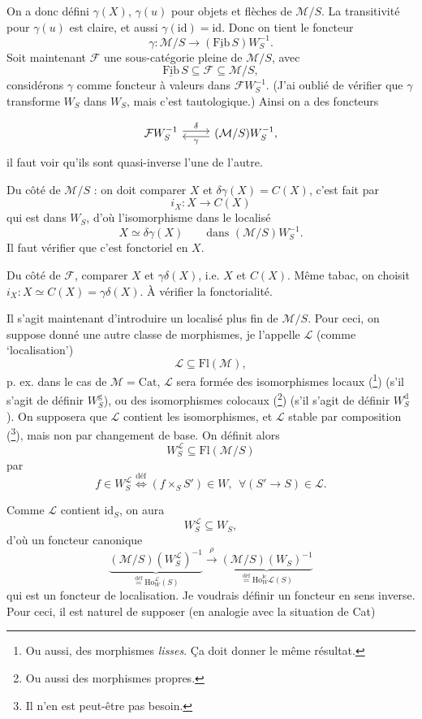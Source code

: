 \documentclass[11pt]{article}
\newcommand{\printedpage}[1]{\marginpar{\footnotesize p.~#1}}
\newcommand{\msp}[1]{\marginpar{\footnotesize [#1]}}
\newcommand{\cM}{\mathcal{M}}
\newcommand{\cF}{\mathcal{F}}
\newcommand{\Fib}{\underline{\mathrm{Fib}}\,}
\newcommand{\Ho}{\mathrm{Ho}}
\newcommand{\WL}{W_S^{\mathcal{L}}}
\newcommand{\defeq}{\overset{\text{déf}}{=}}
\begin{document}
On a donc défini $\gamma(X)$, $\gamma(u)$ pour objets et flèches de $\cM/S$. La transitivité pour $\gamma(u)$ est
claire, et aussi $\gamma(\mathrm{id})=\mathrm{id}$. Donc on tient le foncteur
\[
\gamma:\cM/S\longrightarrow(\Fib S)W_S^{-1}.
\]
Soit maintenant $\cF$ une sous-catégorie pleine de $\cM/S$, avec
\[
\Fib S\subseteq\cF\subseteq\cM/S,
\]
considérons $\gamma$ comme foncteur à valeurs dans $\cF W_S^{-1}$. (J'ai oublié de vérifier que $\gamma$ transforme
$W_S$ dans $W_S$, mais c'est tautologique.) Ainsi on a des foncteurs

\printedpage{59}
\[
\begin{tikzcd}
\mathcal{F}W_S^{-1} \arrow[r, shift left, "\delta"] & (\mathcal{M}/S)W_S^{-1}, \arrow[l, shift left, "\gamma"]
\end{tikzcd}
\]
il faut voir qu'ils sont quasi-inverse l'une de \msp{page 94} l'autre.

Du côté de $\mathcal{M}/S$ : on doit comparer $X$ et $\delta\gamma(X) = C(X)$, c'est fait par
\[
i_X : X \longrightarrow C(X)
\]
qui est dans $W_S$, d'où l'isomorphisme dans le localisé
\[
X \simeq \delta\gamma(X) \qquad \text{dans } (\mathcal{M}/S)W_S^{-1}.
\]
Il faut vérifier que c'est fonctoriel en $X$.

Du côté de $\mathcal{F}$, comparer $X$ et $\gamma\delta(X)$, i.e. $X$ et $C(X)$. Même tabac, on choisit $i_X : X \simeq C(X) = \gamma\delta(X)$. À vérifier la fonctorialité.

Il s'agit maintenant d'introduire un localisé plus fin de $\mathcal{M}/S$. Pour ceci, on suppose donné une autre classe de morphismes, je l'appelle $\mathcal{L}$ (comme `localisation')
\[
\mathcal{L} \subseteq \mathrm{Fl}(\mathcal{M}),
\]
p. ex. dans le cas de $\mathcal{M} = \mathrm{Cat}$, $\mathcal{L}$ sera formée des isomorphismes locaux (\footnote[55]{Ou aussi, des morphismes \textit{lisses}. Ça doit donner le même résultat.}) (s'il s'agit de définir $W_S^{\mathrm{g}}$), ou des isomorphismes colocaux (\footnote[56]{Ou aussi des morphismes propres.}) (s'il s'agit de définir $W_S^{\mathrm{d}}$). On supposera que $\mathcal{L}$ contient les isomorphismes, et $\mathcal{L}$ stable par composition (\footnote[57]{Il n'en est peut-être pas besoin.}), mais non par changement de base. On définit alors
\[
\WL \subseteq \mathrm{Fl}(\mathcal{M}/S)
\]
par
\[
f \in \WL \overset{\text{déf}}{\Longleftrightarrow} (f \times_S S') \in W,\ \ \forall (S' \longrightarrow S) \in \mathcal{L}.
\]
\msp{page 95}

Comme $\mathcal{L}$ contient $\mathrm{id}_S$, on aura
\[
\WL \subseteq W_S,
\]
d'où un foncteur canonique
\[
\underbrace{(\mathcal{M}/S)(\WL)^{-1}}_{\defeq \Ho_W^{\mathcal{L}}(S)} \xrightarrow{\ \rho\ } \underbrace{(\mathcal{M}/S)(W_S)^{-1}}_{\defeq \Ho_W^{\mathrm{lc}}\mathcal{L}(S)} %
\]
\printedpage{60}
qui est un foncteur de localisation. Je voudrais définir un foncteur en sens inverse. Pour ceci, il est naturel de supposer (en analogie avec la situation de Cat)
\end{document}
